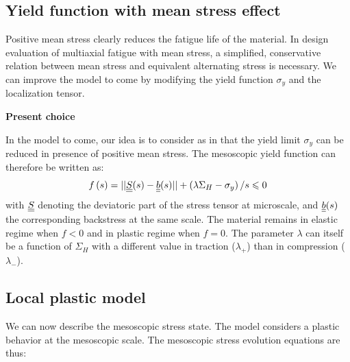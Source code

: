 \newpage
\subsection{Yield function with mean stress effect}
\label{sec:5.4.3}
Positive mean stress clearly reduces the fatigue life of the material. In design evaluation of multiaxial fatigue with mean stress, a simplified, conservative relation between mean stress and equivalent alternating stress is necessary. We can improve the model to come by modifying the yield function $\sigma_y$ and the localization tensor.

\vspace{6pt}
\textbf{Present choice}
\vspace{6pt}

In the model to come, our idea is to consider as in \cite{Maitournam2011232} that the yield limit $\sigma_y$ can be reduced in presence of positive mean stress. The mesoscopic yield function can therefore be written as:
\begin{equation}
f\left(s\right)=||\uline{\uline{S}}(s)-\uline{\uline{b}}(s)||+\left( \lambda \Sigma_H-\sigma_y\right) /s\leqslant 0
\label{eq.yieldfun}
\end{equation}
with $\uline{\uline{S}}$ denoting the deviatoric part of the stress tensor at microscale, and $\uline{\uline{b}}(s)$ the corresponding backstress at the same scale. The material remains in elastic regime when $f<0$ and in plastic regime when $f=0$. The parameter $\lambda$ can itself be a function of $\Sigma_H$ with a different value in traction ($\lambda_+$) than in compression ($\lambda_-$).


\subsection{Local plastic model}
We can now describe the mesoscopic stress state.  The model considers a plastic 
behavior at the mesoscopic scale. The mesoscopic stress evolution equations are thus:

